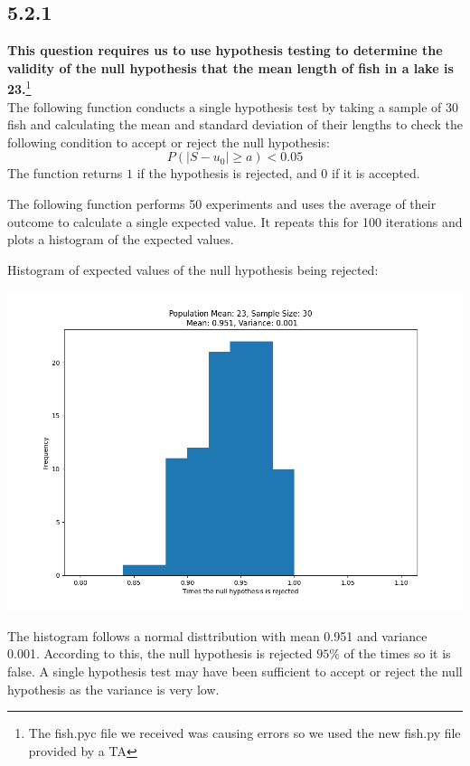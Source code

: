 \documentclass[answers]{exam}
\begin{document}
\subsection*{5.2.1}
\textbf{This question requires us to use hypothesis testing to determine the validity of the null hypothesis that the mean length of fish in a lake is 23.}\footnote{The fish.pyc file we received was causing errors so we used the new fish.py file provided by a TA}\\
The following function conducts a single hypothesis test by taking a sample of $30$ fish and calculating the mean and standard deviation of their lengths to check the following condition to accept or reject the null hypothesis:
\[P(|S - u_0| \geq a) < 0.05\]
The function returns $1$ if the hypothesis is rejected, and $0$ if it is accepted.

The following function performs 50 experiments and uses the average of their outcome to calculate a single expected value. It repeats this for 100 iterations and plots a histogram of the expected values.

Histogram of expected values of the null hypothesis being rejected:
\begin{center}
  \includegraphics[scale = 0.5]{Q5/Q5.2.1.png}
\end{center}
The histogram follows a normal disttribution with mean 0.951 and variance 0.001. According to this, the null hypothesis is rejected $95\%$ of the times so it is false. A single hypothesis test may have been sufficient to accept or reject the null hypothesis as the variance is very low.
\end{document}

